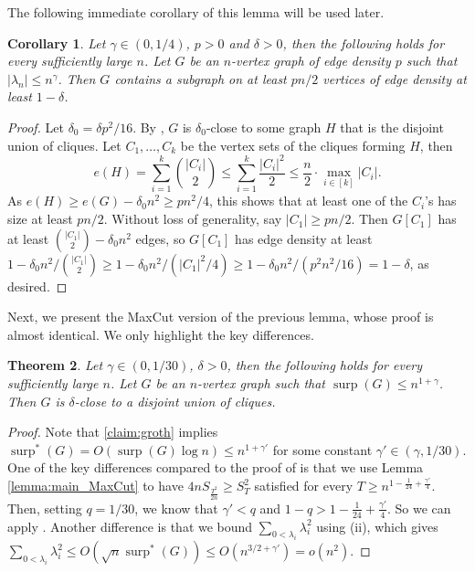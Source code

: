 \documentclass[11pt]{article}
\theoremstyle{plain}
\newtheorem{theorem}{Theorem}[section]
\newtheorem{corollary}[theorem]{Corollary}
\theoremstyle{definition}
\DeclareMathOperator{\surp}{surp}
\begin{document}
The following immediate corollary of this lemma will be used later.

\begin{corollary}\label{cor:dens2_main}
Let $\gamma\in (0,1/4)$, $p>0$ and $\delta>0$, then the following holds for every sufficiently large $n$. Let $G$ be an $n$-vertex graph of edge density $p$ such that $|\lambda_n|\leq n^{\gamma}$. Then $G$ contains a subgraph on at least $pn/2$ vertices of edge density at least $1-\delta$.
\end{corollary}

\begin{proof}
    Let $\delta_0=\delta p^2/16$. 
    By , $G$ is $\delta_0$-close to some graph $H$ that is the disjoint union of cliques. Let $C_1,\dots,C_k$ be the vertex sets of the cliques forming $H$, then 
    $$e(H)=\sum_{i=1}^k\binom{|C_i|}{2}\leq \sum_{i=1}^k\frac{|C_i|^2}{2}\leq \frac{n}{2}\cdot \max_{i\in [k]} |C_i|.$$ 
    As $e(H)\geq e(G)-\delta_0 n^2\geq pn^2/4$, this shows that at least one of the $C_i$'s has size at least $pn/2$.
    Without loss of generality, say $|C_1|\geq pn/2$. 
    Then $G[C_1]$ has at least $\binom{|C_1|}{2}-\delta_0n^2$ edges, so $G[C_1]$ has edge density at least $1-\delta_0n^2/\binom{|C_1|}{2}\ge 1-\delta_0n^2/(|C_1|^2/4)\ge 1-\delta_0n^2/(p^2n^2/16)=1-\delta$, as desired.
\end{proof}

Next, we present the MaxCut version of the previous lemma, whose proof is almost identical. We only highlight the key differences.

\begin{theorem}\label{thm:dens2_main_MaxCut}
Let $\gamma\in (0,1/30)$, $\delta>0$, then the following holds for every sufficiently large $n$. Let $G$ be an $n$-vertex graph such that $\surp(G)\leq n^{1+\gamma}$. Then $G$ is $\delta$-close to a disjoint union of cliques.
\end{theorem}

\begin{proof}
    Note that \cref{claim:groth} implies $\surp^*(G) = O(\surp(G)\log n) \le n^{1+\gamma'}$  for some constant $\gamma' \in (\gamma,1/30)$.
    One of the key differences compared to the proof of  is that we use Lemma \ref{lemma:main_MaxCut} to have $4nS_{\frac{T^2}{2n}}\geq S_T^2$ satisfied for every $T\geq n^{1-\frac{1}{24}+\frac{\gamma'}{4}}$. 
    Then, setting $q=1/30$, we know that $\gamma' < q$ and $1-q >1-\frac{1}{24}+\frac{\gamma'}{4}$.
    So we can apply . Another difference is that we bound $\sum_{0<\lambda_i}\lambda_i^2$ using  (ii), which gives
    $\sum_{0<\lambda_i}\lambda_i^2\leq O(\sqrt{n}\surp^*(G))\leq O(n^{3/2+\gamma'})=o(n^2)$. 
\end{proof}
\end{document}
